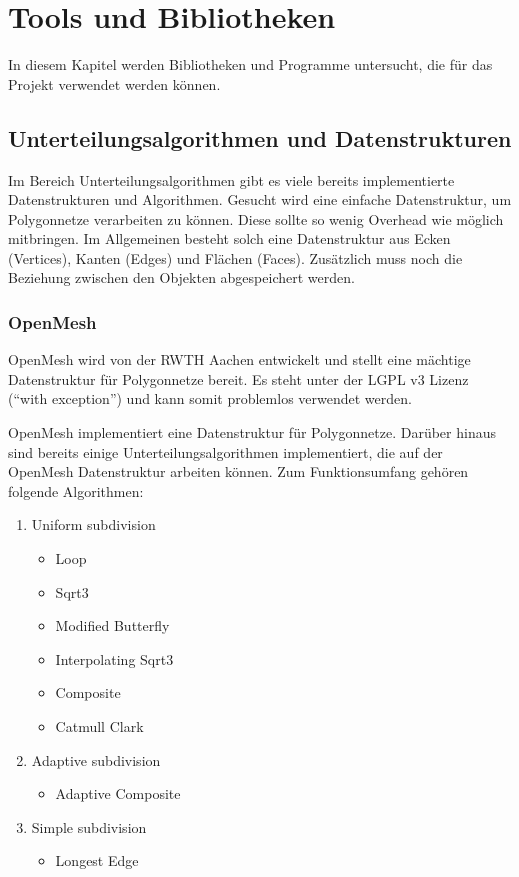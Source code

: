 \chapter{Tools und Bibliotheken}

In diesem Kapitel werden Bibliotheken und Programme untersucht, die für das Projekt verwendet werden können. 
 
\section{Unterteilungsalgorithmen und Datenstrukturen}

Im Bereich Unterteilungsalgorithmen gibt es viele bereits implementierte Datenstrukturen und Algorithmen.
Gesucht wird eine einfache Datenstruktur, um Polygonnetze verarbeiten zu können.
Diese sollte so wenig Overhead wie möglich mitbringen.
Im Allgemeinen besteht solch eine Datenstruktur aus Ecken (Vertices), Kanten (Edges) und Flächen (Faces).
Zusätzlich muss noch die Beziehung zwischen den Objekten abgespeichert werden.

\subsection{OpenMesh}

OpenMesh wird von der RWTH Aachen entwickelt und stellt eine mächtige Datenstruktur für Polygonnetze bereit.
Es steht unter der LGPL v3 Lizenz (\enquote{with exception}) und kann somit problemlos verwendet werden.

OpenMesh implementiert eine Datenstruktur für Polygonnetze.
Darüber hinaus sind bereits einige Unterteilungsalgorithmen implementiert, die auf der OpenMesh Datenstruktur arbeiten können.
Zum Funktionsumfang gehören folgende Algorithmen:

\begin{enumerate}
\item Uniform subdivision
\begin{itemize}
	\item Loop
	\item Sqrt3
	\item Modified Butterfly
	\item Interpolating Sqrt3
	\item Composite
	\item Catmull Clark
\end{itemize}
\item Adaptive subdivision
\begin{itemize}
	\item Adaptive Composite
\end{itemize}
\item Simple subdivision
\begin{itemize}
	\item Longest Edge
\end{itemize}
\end{enumerate}

